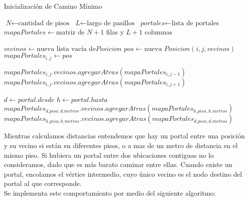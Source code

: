 \begin{algorithm}[H]
\caption{Inicialización de Camino Mínimo}\label{init-ej2}
\begin{algorithmic}[3]
\State $\textit{N} \gets \text{cantidad de pisos}$
\State $\textit{L} \gets \text{largo de pasillos}$
\State $\textit{portales} \gets \text{lista de portales}$
\State $mapaPortales \gets $matriz de $N+1$ filas y $L+1$ columnas

\State $vecinos \gets \text{nueva lista vacía de}Posicion$
\State $pos \gets \text{nueva }Posicion(i,j,vecinos) $
\State $mapaPortales_{i,j} \gets pos$
\EndFor
\EndFor

\State $mapaPortales_{i,j}.vecinos.agregarAtras(mapaPortales_{i,j-1})$
\EndIf
{}
\State $mapaPortales_{i,j}.vecinos.agregarAtras(mapaPortales_{i,j+1})$
\EndIf
\EndFor
\EndFor


\State $d \gets portal.desde$
\State $h \gets portal.hasta$
\State $mapaPortales_{d.piso, d.metros}.vecinos.agregarAtras(mapaPortales_{h.piso, h.metros})$
\State $mapaPortales_{h.piso, h.metros}.vecinos.agregarAtras(mapaPortales_{d.piso, d.metros})$
\EndFor
  

\EndProcedure
\end{algorithmic}
\end{algorithm}


Mientras calculamos distancias entendemos que hay un portal entre una posición y su vecino si están en diferentes pisos, o a mas de un metro de distancia en el mismo piso. 
Si hubiera un portal entre dos ubicaciones contiguas no lo consideramos, dado que es más barato caminar entre ellas.
Cuando existe un portal, encolamos el vértice intermedio, cuyo único vecino es el nodo destino del portal al que corresponde.\\
Se implementa este comportamiento por medio del siguiente algoritmo:



